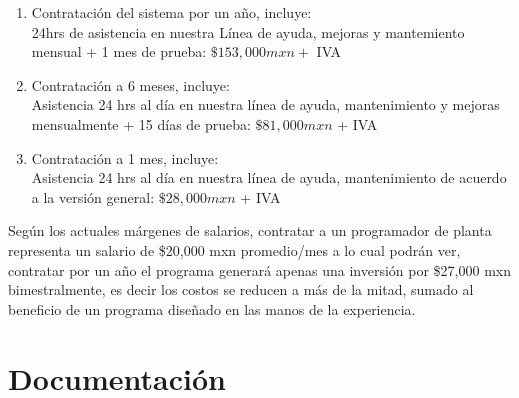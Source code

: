\documentclass{article}
\begin{document}
\begin{enumerate}
    \item Contratación del sistema por un año, incluye:\\
    24hrs de asistencia en nuestra Línea de ayuda, mejoras y mantemiento mensual + 1 mes de prueba: $\$ 153,000mxn + $ IVA 
    \item Contratación a 6 meses, incluye:\\
   Asistencia 24 hrs al día en nuestra línea de ayuda, mantenimiento y mejoras mensualmente +   15 días de prueba: $ \$81,000mxn $ + IVA  
   \item Contratación a 1 mes, incluye:\\
   Asistencia 24 hrs al día en nuestra línea de ayuda, mantenimiento de acuerdo a la versión general: $\$28,000 mxn$ + IVA
   
    
\end{enumerate}
Según los actuales márgenes de salarios, contratar a un programador de planta representa un salario de \$20,000 mxn promedio/mes
a lo cual podrán ver, contratar por un año el programa generará apenas una inversión por \$27,000 mxn bimestralmente, es decir los costos se reducen a más de la mitad, sumado al beneficio de un programa diseñado en las manos de la experiencia.

\section{Documentación}
\end{document}
